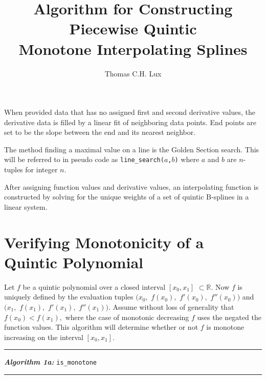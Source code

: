 \documentclass{article}
\begin{document}
\title{Algorithm for Constructing Piecewise Quintic \\ Monotone Interpolating Splines}
\author{Thomas C.H. Lux}
\maketitle

When provided data that has no assigned first and second derivative values, the derivative data is filled by a linear fit of neighboring data points. End points are set to be the slope between the end and its nearest neighbor.

The method finding a maximal value on a line is the Golden Section search. This will be referred to in pseudo code as \texttt{line\_search($a$,$b$)} where $a$ and $b$ are $n$-tuples for integer $n$.

After assigning function values and derivative values, an interpolating function is constructed by solving for the unique weights of a set of quintic B-splines in a linear system.

\vspace{10pt}


\section{Verifying Monotonicity of a Quintic Polynomial}
\label{is_monotone}
Let $f$ be a quintic polynomial over a closed interval $[x_0, x_1]$ $\subset \mathbb{R}$. Now $f$ is uniquely defined by the evaluation tuples $\big(x_0,$ $f(x_0),$ $f'(x_0),$ $f''(x_0)\big)$ and $\big(x_1,$ $f(x_1),$ $f'(x_1),$ $f''(x_1)\big).$ Assume without loss of generality that $f(x_0) < f(x_1),$ where the case of monotonic decreasing $f$ uses the negated the function values. This algorithm will determine whether or not $f$ is monotone increasing on the interval $[x_0, x_1].$

\vspace{10pt}
\hrule
\vspace{3pt}
\noindent\textbf{\textit{Algorithm 1a:}} \texttt{is\_monotone}
\vspace{3pt}
\hrule
\end{document}
